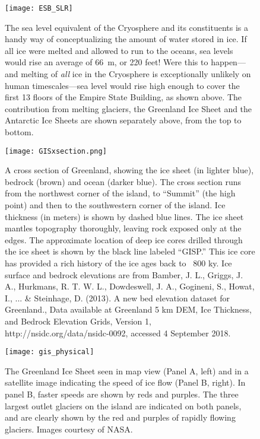 \documentclass[amstex,12pt]{book}
\begin{document}
\begin{figure}[p]
	\centering
  \texttt{[image: ESB\_SLR]}%
	\caption{The sea level equivalent of the Cryosphere and its constituents is a handy way of conceptualizing the amount of water stored in ice. If all ice were melted and allowed to run to the oceans, sea levels would rise an average of \SI{66}{\metre}, or 220 feet! Were this to happen---and melting of \emph{all} ice in the Cryosphere is exceptionally unlikely on human timescales---sea level would rise high enough to cover the first 13 floors of the Empire State Building, as shown above. The contribution from melting glaciers, the Greenland Ice Sheet and the Antarctic Ice Sheets are shown separately above, from the top to bottom.}  
	\label{fig:ESB}
\end{figure}


\begin{figure}[p]
	\centering
  \texttt{[image: GISxsection.png]}%
	\caption{A cross section of Greenland, showing the ice sheet (in lighter blue), bedrock (brown) and ocean (darker blue). The cross section runs from the northwest corner of the island, to ``Summit'' (the high point) and then to the southwestern corner of the island. Ice thickness (in meters) is shown by dashed blue lines. The ice sheet mantles topography thoroughly, leaving rock exposed only at the edges. The approximate location of deep ice cores drilled through the ice sheet is shown by the black line labeled ``GISP.'' This ice core has provided a rich history of the ice ages back to ~800 ky. Ice surface and bedrock elevations are from Bamber, J. L., Griggs, J. A., Hurkmans, R. T. W. L., Dowdeswell, J. A., Gogineni, S., Howat, I., ... \& Steinhage, D. (2013). A new bed elevation dataset for Greenland., Data available at Greenland 5 km DEM, Ice Thickness, and Bedrock Elevation Grids, Version 1, http://nsidc.org/data/nsidc-0092, accessed 4 September 2018.}  
	\label{fig:GISxsection}
\end{figure}

\begin{figure}[p]
	\centering
  \texttt{[image: gis\_physical]}%
	\caption{The Greenland Ice Sheet seen in map view (Panel A, left) and in a satellite image indicating the speed of ice flow (Panel B, right). In panel B, faster speeds are shown by reds and purples. The three largest outlet glaciers on the island are indicated on both panels, and are clearly shown by the red and purples of rapidly flowing glaciers. Images courtesy of NASA. }  
	\label{fig:gis_physical}
\end{figure}
\end{document}
